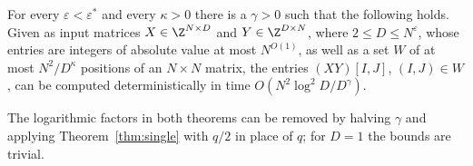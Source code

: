 \begin{theorem}\label{thm:general}
For every $\varepsilon<\varepsilon^*$ and every $\kappa>0$ there is a $\gamma>0$ such that the following holds. Given as input matrices $X\in\Z^{N\times D}$ and $Y\in\Z^{D\times N}$, where $2\le D\le N^{\varepsilon}$, whose entries are integers of absolute value at most $N^{O(1)}$, as well as a set $W$ of at most $N^2/D^{\kappa}$ positions of an $N\times N$ matrix, the entries $(XY)[I,J]$, $(I,J)\in W$, can be computed deterministically in time $O(N^2\log^2\!D/D^{\gamma})$.
\end{theorem}

The logarithmic factors in both theorems can be removed by halving $\gamma$ and applying Theorem~\ref{thm:single} with $q/2$ in place of $q$; for $D=1$ the bounds are trivial.

